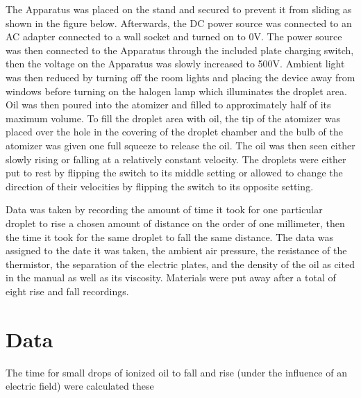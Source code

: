 \documentclass[]{article}
\begin{document}
The Apparatus was placed on the stand and secured to prevent it from sliding as shown in the figure below. Afterwards, the DC power source was connected to an AC adapter connected to a wall socket and turned on to 0V. The power source was then connected to the Apparatus through the included plate charging switch, then the voltage on the Apparatus was slowly increased to 500V. Ambient light was then reduced by turning off the room lights and placing the device away from windows before turning on the halogen lamp which illuminates the droplet area. Oil was then poured into the atomizer and filled to approximately half of its maximum volume. To fill the droplet area with oil, the tip of the atomizer was placed over the hole in the covering of the droplet chamber and the bulb of the atomizer was given one full squeeze to release the oil. The oil was then seen either slowly rising or falling at a relatively constant velocity. The droplets were either put to rest by flipping the switch to its middle setting or allowed to change the direction of their velocities by flipping the switch to its opposite setting. 


Data was taken by recording the amount of time it took for one particular droplet to rise a chosen amount of distance on the order of one millimeter, then the time it took for the same droplet to fall the same distance. The data was assigned to the date it was taken, the ambient air pressure, the resistance of the thermistor, the separation of the electric plates, and the density of the oil as cited in the manual as well as its viscosity. Materials were put away after a total of eight rise and fall recordings.

\section{Data}
The time for small drops of ionized oil to fall and rise (under the influence of an electric field) were calculated these 
\end{document}
